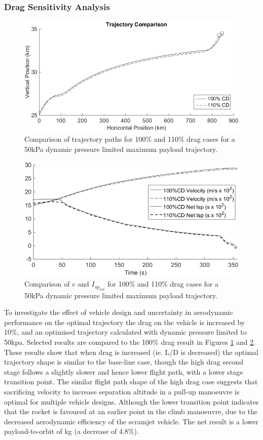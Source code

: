 \subsubsection{Drag Sensitivity Analysis}\label{subsection:dragvariation}
\begin{figure}[ht]
	\centering
	\includegraphics[width=.7\linewidth]{figures/5_Ascent/DragComparisonTraj}
	\caption{Comparison of trajectory paths for 100\% and 110\% drag cases for a 50kPa dynamic pressure limited maximum payload trajectory.}
	\label{fig:DragCompTraj}
\end{figure}

\begin{figure}[ht]
	\centering
	\includegraphics[width=.6\linewidth]{figures/5_Ascent/DragComparisonOther}
	\caption{Comparison of $v$ and $I_{sp_{net}}$ for 100\% and 110\% drag cases for a 50kPa dynamic pressure limited maximum payload trajectory.}
	\label{fig:DragCompOther}
\end{figure}

To investigate the effect of vehicle design and uncertainty in aerodynamic performance on the optimal trajectory the drag on the vehicle is increased by 10\%, and an optimised trajectory calculated with dynamic pressure limited to 50kpa. Selected results are compared to the 100\% drag result in Figures \ref{fig:DragCompTraj} and \ref{fig:DragCompOther}. 
These results show that when drag is increased (ie. L/D is decreased) the optimal trajectory shape is similar to the base-line case, though the high drag second stage follows a slightly slower and hence lower flight path, with a lower stage transition point. The similar flight path shape of the high drag case suggests that sacrificing velocity to increase separation altitude in a pull-up manoeuvre is optimal for multiple vehicle designs. Although the lower transition point indicates that the rocket is favoured at an earlier point in the climb manoeuvre, due to the decreased aerodynamic efficiency of the scramjet vehicle. 
The net result is  a lower payload-to-orbit of \PayloadToOrbitHighDrag kg (a decrease of 4.8\%). 




